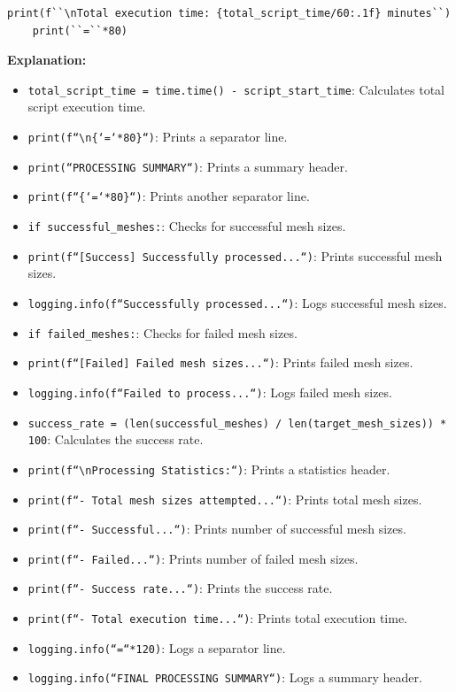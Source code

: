 \documentclass{book}
\begin{document}
\begin{itemize}[leftmargin=*,label=\textbullet]
\begin{lstlisting}[caption={Main Execution Block - Summary and Recommendations},label={lst:main_4}]
    print(f``\nTotal execution time: {total_script_time/60:.1f} minutes``)
    print(``=``*80)
\end{lstlisting}
\textbf{Explanation:}
\begin{itemize}
    \item \texttt{total\_script\_time = time.time() - script\_start\_time}: Calculates total script execution time.
    \item \texttt{print(f``\textbackslash n\{`=`*80\}``)}: Prints a separator line.
    \item \texttt{print(``PROCESSING SUMMARY``)}: Prints a summary header.
    \item \texttt{print(f``\{`=`*80\}``)}: Prints another separator line.
    \item \texttt{if successful\_meshes:}: Checks for successful mesh sizes.
    \item \texttt{print(f``[Success] Successfully processed...``)}: Prints successful mesh sizes.
    \item \texttt{logging.info(f``Successfully processed...``)}: Logs successful mesh sizes.
    \item \texttt{if failed\_meshes:}: Checks for failed mesh sizes.
    \item \texttt{print(f``[Failed] Failed mesh sizes...``)}: Prints failed mesh sizes.
    \item \texttt{logging.info(f``Failed to process...``)}: Logs failed mesh sizes.
    \item \texttt{success\_rate = (len(successful\_meshes) / len(target\_mesh\_sizes)) * 100}: Calculates the success rate.
    \item \texttt{print(f``\textbackslash nProcessing Statistics:``)}: Prints a statistics header.
    \item \texttt{print(f``- Total mesh sizes attempted...``)}: Prints total mesh sizes.
    \item \texttt{print(f``- Successful...``)}: Prints number of successful mesh sizes.
    \item \texttt{print(f``- Failed...``)}: Prints number of failed mesh sizes.
    \item \texttt{print(f``- Success rate...``)}: Prints the success rate.
    \item \texttt{print(f``- Total execution time...``)}: Prints total execution time.
    \item \texttt{logging.info(``=``*120)}: Logs a separator line.
    \item \texttt{logging.info(``FINAL PROCESSING SUMMARY``)}: Logs a summary header.

\end{itemize}
\end{itemize}
\end{document}
